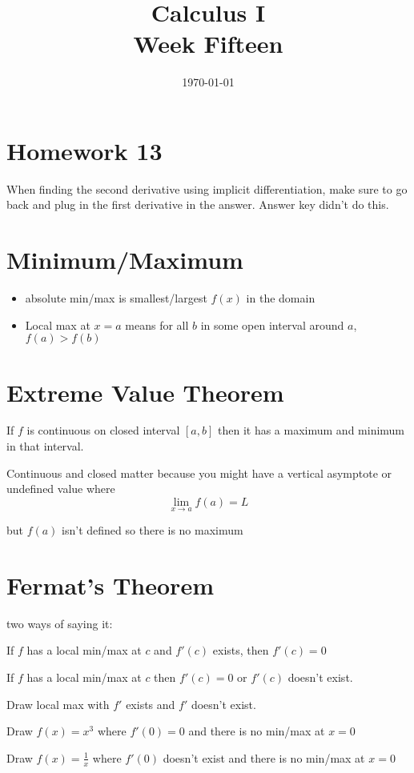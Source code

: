 \documentclass[letterpaper, landscape]{exam}
\author{}
\date{\today}
\title{Calculus I \\ Week Fifteen}
\begin{document}
  \maketitle
  \tableofcontents
  \section{Homework 13} %
  \label{sec:Homework 13}

  When finding the second derivative using implicit differentiation, make sure to go back and plug
  in the first derivative in the answer. Answer key didn't do this.
  
  \section{Minimum/Maximum} %

  \begin{itemize}
    \item absolute min/max is smallest/largest $f(x)$ in the domain
    \item Local max at $x = a$ means for all $b$ in some open interval around $a$, $f(a) > f(b)$
  \end{itemize}

  \section{Extreme Value Theorem} %
  
  If $f$ is continuous on closed interval $[a, b]$ then it has a maximum and minimum in that
  interval.

  Continuous and closed matter because you might have a vertical asymptote or undefined value where
  \[
    \lim_{x \to a} f(a) = L
  \]

  but $f(a)$ isn't defined so there is no maximum
  
  \section{Fermat's Theorem} %
  
  two ways of saying it:
  \begin{itemize*}
    \item If $f$ has a local min/max at $c$ and $f'(c)$ exists, then $f'(c) = 0$ 
    \item If $f$ has a local min/max at $c$ then $f'(c) = 0$ or $f'(c)$ doesn't exist.
  \end{itemize*}

  \begin{itemize*}
    \item Draw local max with $f'$ exists and $f'$ doesn't exist.
    \item Draw $f(x) = x^3$ where $f'(0) = 0$ and there is no min/max at $x = 0$
    \item Draw $f(x) = \frac{1}{x}$ where $f'(0)$ doesn't exist and there is no min/max at $x = 0$
  \end{itemize*}
\end{document}

